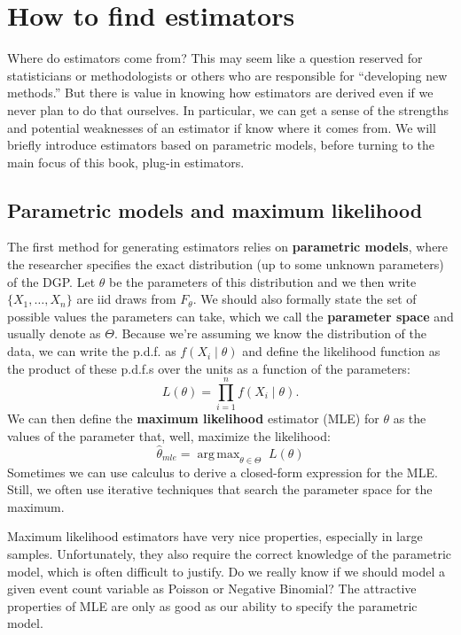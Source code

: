 \documentclass[
  letterpaper,
  DIV=11,
  numbers=noendperiod]{scrreprt}
\DeclareMathOperator*{\argmax}{arg\,max}
\theoremstyle{definition}
\theoremstyle{plain}
\theoremstyle{definition}
\theoremstyle{remark}
\begin{document}
\hypertarget{how-to-find-estimators}{%
\section{How to find estimators}\label{how-to-find-estimators}}

Where do estimators come from? This may seem like a question reserved
for statisticians or methodologists or others who are responsible for
``developing new methods.'' But there is value in knowing how estimators
are derived even if we never plan to do that ourselves. In particular,
we can get a sense of the strengths and potential weaknesses of an
estimator if know where it comes from. We will briefly introduce
estimators based on parametric models, before turning to the main focus
of this book, plug-in estimators.

\hypertarget{parametric-models-and-maximum-likelihood}{%
\subsection{Parametric models and maximum
likelihood}\label{parametric-models-and-maximum-likelihood}}

The first method for generating estimators relies on \textbf{parametric
models}, where the researcher specifies the exact distribution (up to
some unknown parameters) of the DGP. Let \(\theta\) be the parameters of
this distribution and we then write \(\{X_1, \ldots, X_n\}\) are iid
draws from \(F_{\theta}\). We should also formally state the set of
possible values the parameters can take, which we call the
\textbf{parameter space} and usually denote as \(\Theta\). Because we're
assuming we know the distribution of the data, we can write the p.d.f.
as \(f(X_i \mid \theta)\) and define the likelihood function as the
product of these p.d.f.s over the units as a function of the parameters:
\[
L(\theta) = \prod_{i=1}^n f(X_i \mid \theta).
\] We can then define the \textbf{maximum likelihood} estimator (MLE)
for \(\theta\) as the values of the parameter that, well, maximize the
likelihood: \[
\widehat{\theta}_{mle} = \argmax_{\theta \in \Theta} \; L(\theta)
\] Sometimes we can use calculus to derive a closed-form expression for
the MLE. Still, we often use iterative techniques that search the
parameter space for the maximum.

Maximum likelihood estimators have very nice properties, especially in
large samples. Unfortunately, they also require the correct knowledge of
the parametric model, which is often difficult to justify. Do we really
know if we should model a given event count variable as Poisson or
Negative Binomial? The attractive properties of MLE are only as good as
our ability to specify the parametric model.
\end{document}
